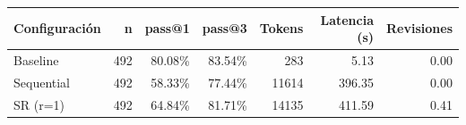 \begin{tabular}{lrrrrrr}
\toprule
Configuración & n & pass@1 & pass@3 & Tokens & Latencia (s) & Revisiones \\
\midrule
Baseline & 492 & 80.08\% & 83.54\% & 283 & 5.13 & 0.00 \\
Sequential & 492 & 58.33\% & 77.44\% & 11614 & 396.35 & 0.00 \\
SR (r=1) & 492 & 64.84\% & 81.71\% & 14135 & 411.59 & 0.41 \\
\bottomrule
\end{tabular}
